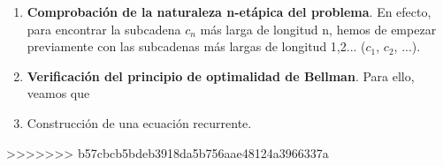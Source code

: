 \begin{enumerate}
    \item \textbf{Comprobación de la naturaleza n-etápica del problema}. En efecto, 
    para encontrar la subcadena $c_n$ más larga de longitud n, hemos de empezar 
    previamente con las subcadenas más largas de longitud 1,2... ($c_1$, $c_2$, ...). 

    \item \textbf{Verificación del principio de optimalidad de Bellman}. Para ello, 
    veamos que 
    \item Construcción de una ecuación recurrente. 
\end{enumerate}





>>>>>>> b57cbcb5bdeb3918da5b756aae48124a3966337a
